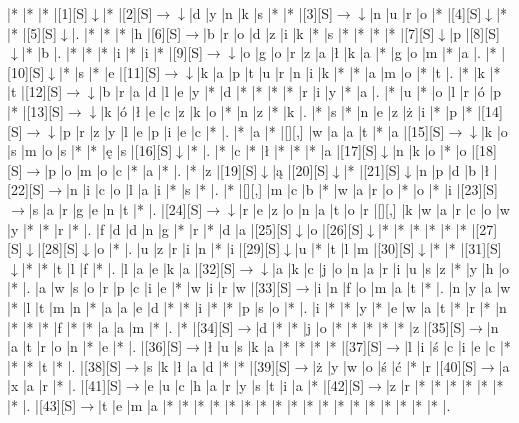 \documentclass[11pt]{article}
\newcommand\drarr{$\rightarrow \!\!\!\!\! \downarrow$}
\newcommand\rarr{$\rightarrow$}
\newcommand\darr{$\downarrow$}
\begin{document}
\noindent\begin{Puzzle}{22}{22}|*	|*	|*	|[1][S]\darr	|*	|[2][S]\drarr	|d	|y	|n	|k	|s	|*	|*	|[3][S]\drarr	|n	|u	|r	|o	|*	|[4][S]\darr	|*	|*	|[5][S]\darr	|.
|*	|*	|*	|h	|[6][S]\rarr	|b	|r	|o	|d	|z	|i	|k	|*	|s	|*	|*	|*	|*	|[7][S]\darr	|p	|[8][S]\darr	|*	|b	|.
|*	|*	|*	|i	|*	|i	|*	|[9][S]\drarr	|o	|g	|o	|r	|z	|a	|ł	|k	|a	|*	|g	|o	|m	|*	|a	|.
|*	|[10][S]\darr	|*	|s	|*	|e	|[11][S]\drarr	|k	|a	|p	|t	|u	|r	|n	|i	|k	|*	|*	|a	|m	|o	|*	|t	|.
|*	|k	|*	|t	|[12][S]\drarr	|b	|r	|a	|d	|l	|e	|y	|*	|d	|*	|*	|*	|*	|r	|i	|y	|*	|a	|.
|*	|u	|*	|o	|l	|r	|ó	|p	|*	|[13][S]\drarr	|k	|ó	|ł	|e	|c	|z	|k	|o	|*	|n	|z	|*	|k	|.
|*	|s	|*	|n	|e	|z	|ż	|i	|*	|p	|*	|[14][S]\drarr	|p	|r	|z	|y	|l	|e	|p	|i	|e	|c	|*	|.
|*	|a	|*	|[][,]{ }	|w	|a	|a	|t	|*	|a	|[15][S]\drarr	|k	|o	|s	|m	|o	|s	|*	|*	|ę	|s	|[16][S]\darr	|*	|.
|*	|c	|*	|ł	|*	|*	|*	|a	|[17][S]\darr	|n	|k	|o	|*	|o	|[18][S]\rarr	|p	|o	|m	|o	|c	|*	|a	|*	|.
|*	|z	|[19][S]\darr	|ą	|[20][S]\darr	|*	|[21][S]\darr	|n	|p	|d	|b	|ł	|[22][S]\rarr	|n	|i	|c	|o	|l	|a	|i	|*	|s	|*	|.
|*	|[][,]{ }	|m	|c	|b	|*	|w	|a	|r	|o	|*	|o	|*	|i	|[23][S]\rarr	|s	|a	|r	|g	|e	|n	|t	|*	|.
|[24][S]\drarr	|r	|e	|z	|o	|n	|a	|t	|o	|r	|[][,]{ }	|k	|w	|a	|r	|c	|o	|w	|y	|*	|*	|r	|*	|.
|f	|d	|d	|n	|g	|*	|r	|*	|d	|a	|[25][S]\darr	|o	|[26][S]\darr	|*	|*	|*	|*	|*	|*	|[27][S]\darr	|[28][S]\darr	|o	|*	|.
|u	|z	|r	|i	|n	|*	|i	|[29][S]\darr	|u	|*	|t	|l	|m	|[30][S]\darr	|*	|*	|[31][S]\darr	|*	|*	|t	|l	|f	|*	|.
|l	|a	|e	|k	|a	|[32][S]\drarr	|a	|k	|c	|j	|o	|n	|a	|r	|i	|u	|s	|z	|*	|y	|h	|o	|*	|.
|a	|w	|s	|o	|r	|p	|c	|i	|e	|*	|w	|i	|r	|w	|[33][S]\rarr	|i	|n	|f	|o	|m	|a	|t	|*	|.
|n	|y	|a	|w	|*	|l	|t	|m	|n	|*	|a	|a	|e	|d	|*	|*	|i	|*	|*	|p	|s	|o	|*	|.
|i	|*	|*	|y	|*	|e	|w	|a	|t	|*	|r	|*	|n	|*	|*	|*	|f	|*	|*	|a	|a	|m	|*	|.
|*	|[34][S]\rarr	|d	|*	|*	|j	|o	|*	|*	|*	|*	|*	|z	|[35][S]\rarr	|n	|a	|t	|r	|o	|n	|*	|e	|*	|.
|[36][S]\rarr	|ł	|u	|s	|k	|a	|*	|*	|*	|*	|[37][S]\rarr	|l	|i	|ś	|c	|i	|e	|c	|*	|*	|*	|t	|*	|.
|[38][S]\rarr	|s	|k	|ł	|a	|d	|*	|*	|[39][S]\rarr	|ż	|y	|w	|o	|ś	|ć	|*	|r	|[40][S]\rarr	|a	|x	|a	|r	|*	|.
|[41][S]\rarr	|e	|u	|c	|h	|a	|r	|y	|s	|t	|i	|a	|*	|[42][S]\rarr	|z	|r	|*	|*	|*	|*	|*	|*	|*	|.
|[43][S]\rarr	|t	|e	|m	|a	|*	|*	|*	|*	|*	|*	|*	|*	|*	|*	|*	|*	|*	|*	|*	|*	|*	|*	|.\end{Puzzle}

\newpage
\end{document}

